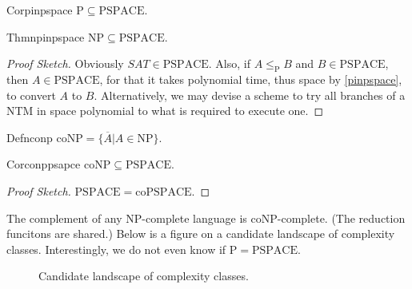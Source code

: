 \begin{reference}{Cor}{pinpspace}
  $\mathrm{P}\subseteq \mathrm{PSPACE}$.
\end{reference}

\begin{reference}{Thm}{npinpspace}
  $\mathrm{NP}\subseteq \mathrm{PSPACE}$.
\end{reference}

\begin{proof}[Proof Sketch]
  Obviously $\textit{SAT}\in \mathrm{PSPACE}$. Also, if $A\leq_{\mathrm{P}}B$ and $B\in \mathrm{PSPACE}$, then $A\in \mathrm{PSPACE}$, for that it takes polynomial time, thus space by \ref{pinpspace}, to convert $A$ to $B$. Alternatively, we may devise a scheme to try all branches of a NTM in space polynomial to what is required to execute one.
\end{proof}

\begin{reference}{Defn}{conp}
  $\mathrm{coNP}=\{\overline{A}|A\in \mathrm{NP}\}$.
\end{reference}

\begin{reference}{Cor}{conppsapce}
  $\mathrm{coNP}\subseteq \mathrm{PSPACE}$.
\end{reference}

\begin{proof}[Proof Sketch]
  $\mathrm{PSPACE}= \mathrm{coPSPACE}$.
\end{proof}

The complement of any NP-complete language is coNP-complete. (The reduction funcitons are shared.) Below is a figure on a candidate landscape of complexity classes. Interestingly, we do not even know if $\mathrm{P}=\mathrm{PSPACE}$.

\begin{figure}[H]
  \centering
  \caption{Candidate landscape of complexity classes.}
\end{figure}

